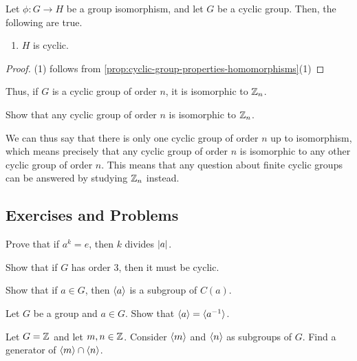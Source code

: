 \documentclass[./main.tex]{subfiles}
\begin{document}
\begin{proposition}
    Let $\phi: G \to H$ be a group isomorphism, and let $G$ be a cyclic group.
    Then, the following are true.
    \begin{enumerate}
        \item $H$ is cyclic. 
    \end{enumerate}
\end{proposition}
\begin{proof}
    (1) follows from \cref{prop:cyclic-group-properties-homomorphisms}(1)
\end{proof}
Thus, if $G$ is a cyclic group of order $n$, it is isomorphic to $\mathbb{Z}_n$.
\begin{exercise}
    Show that any cyclic group of order $n$ is isomorphic to $\mathbb{Z}_n$.
\end{exercise}
We can thus say that there is only one cyclic group of order $n$ up to
isomorphism, which means precisely that any cyclic group of order $n$ is
isomorphic to any other cyclic group of order $n$. This means that any question
about finite cyclic groups can be answered by studying $\mathbb{Z}_n$ instead.

\subsection{Exercises and Problems}

\begin{exercise}
    Prove that if $a^k = e$, then $k$ divides $\abs{a}$.
\end{exercise}

\begin{exercise}
    Show that if $G$ has order 3, then it must be cyclic.
\end{exercise}

\begin{exercise}
    Show that if $a \in G$, then ${ \langle a \rangle }$ is a subgroup of $C(a)$.
\end{exercise}

\begin{exercise}
    Let $G$ be a group and $a \in G$. Show that ${ \langle a \rangle } = { \langle a^{-1} \rangle }$.
\end{exercise}

\begin{exercise}
    Let $G = \mathbb{Z}$ and let $m, n \in \mathbb{Z}$. Consider ${ \langle m \rangle }$ and ${ \langle n \rangle }$ as
    subgroups of $G$. Find a generator of ${ \langle m \rangle } \cap { \langle n \rangle }$.
\end{exercise}
\end{document}
